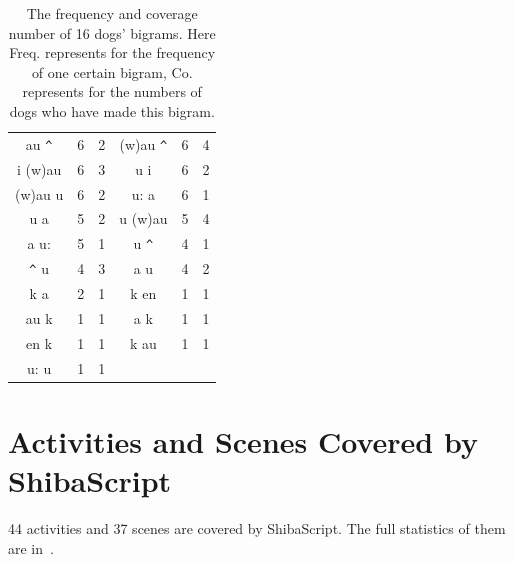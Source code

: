 \begin{table}[th]
\begin{tabular}{c|c|c|c|c|c}
au \verb|^| & 6 & 2 & (w)au \verb|^| & 6 & 4 \\
i (w)au & 6 & 3 & u i & 6 & 2 \\
(w)au u & 6 & 2 & u: a & 6 & 1 \\
u a & 5 & 2 & u (w)au & 5 & 4 \\
a u: & 5 & 1 & u \verb|^| & 4 & 1 \\
\verb|^| u & 4 & 3 & a u & 4 & 2 \\
k a & 2 & 1 & k en & 1 & 1 \\
au k & 1 & 1 & a k & 1 & 1 \\
en k & 1 & 1 & k au & 1 & 1 \\
u: u & 1 & 1 &  &  & \\
\hline
\end{tabular}
\caption{The frequency and coverage number of 16 dogs' bigrams. Here Freq. represents for the frequency of one certain bigram, Co. represents for the numbers of dogs who have made this bigram.}
\label{tab:bigramfull}
\end{table}



\section{Activities and Scenes Covered by ShibaScript}
\label{sec:appendix_a}
44 activities and 37 scenes are covered by ShibaScript. The full statistics of them are in~.

